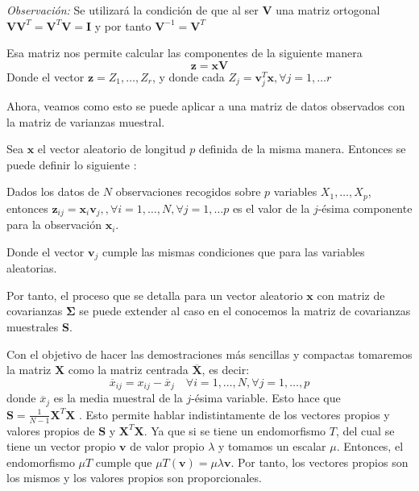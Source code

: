 \noindent \emph{Observación: }Se utilizará la condición de que al ser $\mathbf{V}$ una matriz ortogonal $\mathbf{VV}^T=\mathbf{V}^T\mathbf{V}=\mathbf{I}$ y por tanto $\mathbf{V}^{-1}=\mathbf{V}^T$

\noindent Esa matriz nos permite calcular las componentes de la siguiente manera
\begin{equation}
\mathbf{z}=\mathbf{x} \mathbf{V}
\end{equation} 
\noindent Donde el vector $\mathbf{z}=Z_1,\ldots, Z_r$, y donde cada $Z_j=\mathbf{v}_j^T\mathbf{x}, \forall j=1,\ldots r$

\noindent Ahora, veamos como esto se puede aplicar a una matriz de datos observados con la matriz de varianzas muestral.

\noindent Sea $\mathbf{x}$ el vector aleatorio de longitud $p$ definida de la misma manera. Entonces se puede definir lo siguiente :

\begin{defi}
Dados los datos de $N$ observaciones recogidos sobre $p$ variables $X_1,\ldots, X_p$, entonces $\mathbf{z}_{ij}=\mathbf{x}_i\mathbf{v}_j, ,\forall i=1,\ldots, N,\forall j=1,\ldots p$ es el valor de la $j$-ésima componente para la observación $\mathbf{x}_i$. 

\noindent Donde el vector $\mathbf{v}_j$ cumple las mismas condiciones que para las variables aleatorias. 
\end{defi}

\noindent Por tanto, el proceso que se detalla para un vector aleatorio $\mathbf{x}$ con matriz de covarianzas $\mathbf{\Sigma}$ se puede extender al caso en el conocemos la matriz de covarianzas muestrales \textbf{S}.

\noindent Con el objetivo de hacer las demostraciones más sencillas y compactas tomaremos la matriz $\textbf{X}$ como la matriz centrada $\overline{\textbf{X}}$, es decir: 
\begin{equation}
\overline{x}_{ij}=x_{ij}-\overline{x}_j \quad \forall i=1,\ldots,N,\forall j=1,\ldots,p
\end{equation}
donde $\overline{x}_j$ es la media muestral de la $j$-ésima variable. Esto hace que $\textbf{S}=\frac{1}{N-1}\textbf{X}^T\textbf{X}$ \cite{Peña 2002}. Esto permite hablar indistintamente de los vectores propios y valores propios de $\mathbf{S}$ y $\mathbf{X}^T\mathbf{X}$. Ya que si se tiene un endomorfismo $T$, del cual se tiene un vector propio $\mathbf{v}$ de valor propio $\lambda$ y tomamos un escalar $\mu$. Entonces, el endomorfismo $\mu T$ cumple que $\mu T(\mathbf{v})=\mu \lambda \mathbf{v}$. Por tanto, los vectores propios son los mismos y los valores propios son proporcionales. 

